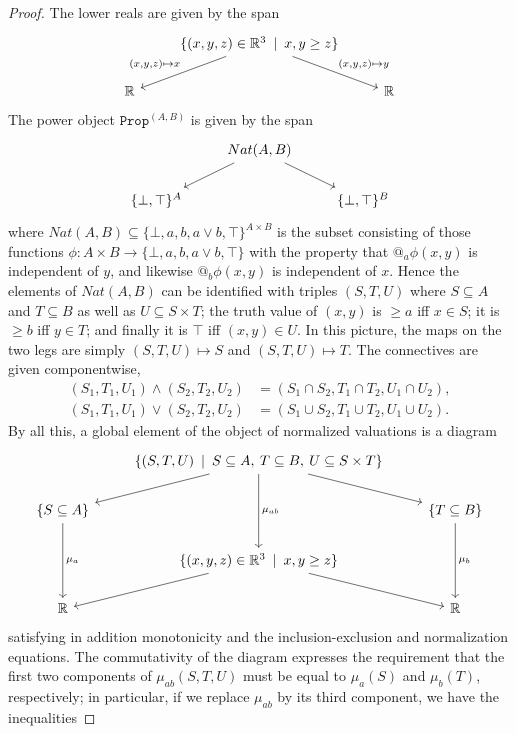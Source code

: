 \documentclass[11pt, oneside, article]{memoir}
\makeatletter
\theoremstyle{plain}
\theoremstyle{definition}
\theoremstyle{remark}
\newcommand{\const}[1]{\mathtt{#1}}
\newcommand{\Prop}{\const{Prop}}
\newcommand{\AtSymbol}{{@}}
\newcommand{\At}[2][]{\AtSymbol^{#1}_{#2}}
\makeatother
\begin{document}
\begin{proof}
The lower reals are given by the span
\[\begin{tikzcd}
	& \{ (x, y, z) \in\mathbb{R}^3 \:\mid\: x,y\geq z \} \ar[swap]{dl}{(x,y,z)\mapsto x} \ar{dr}{(x,y,z)\mapsto y} \\
	\mathbb{R} & & \mathbb{R}
\end{tikzcd}\]
The power object $\Prop^{(A,B)}$ is given by the span
\[\begin{tikzcd}
	& Nat(A,B) \ar{dl} \ar{dr} \\
	\{\bot,\top\}^A & & \{\bot,\top\}^B
\end{tikzcd}\]
where $Nat(A,B)\subseteq \{\bot,a,b,a\lor b,\top\}^{A\times B}$ is the subset consisting of those functions $\phi : A\times B \to \{\bot,a,b,a\lor b,\top\}$ with the property that $\At{a} \phi(x,y)$ is independent of $y$, and likewise $\At{b} \phi(x,y)$ is independent of $x$. Hence the elements of $Nat(A,B)$ can be identified with triples $(S,T,U)$ where $S\subseteq A$ and $T\subseteq B$ as well as $U\subseteq S\times T$; the truth value of $(x,y)$ is $\geq a$ iff $x\in S$; it is $\geq b$ iff $y\in T$; and finally it is $\top$ iff $(x,y)\in U$. In this picture, the maps on the two legs are simply $(S,T,U)\mapsto S$ and $(S,T,U)\mapsto T$. The connectives are given componentwise,
\begin{align*}
	(S_1,T_1,U_1) \land (S_2,T_2,U_2) & = (S_1\cap S_2,T_1\cap T_2,U_1\cap U_2),\\
	(S_1,T_1,U_1) \lor (S_2,T_2,U_2)  & = (S_1\cup S_2,T_1\cup T_2,U_1\cup U_2).
\end{align*}
By all this, a global element of the object of normalized valuations is a diagram
\[\begin{tikzcd}
	& \{(S,T,U) \:\mid\: S \subseteq A , \: T \subseteq B , \: U \subseteq S\times T \} \ar{dl} \ar{dr} \ar{dd}{\mu_{ab}} \\
	\{ S \subseteq A \} \ar{dd}{\mu_a} & & \{ T \subseteq B \} \ar{dd}{\mu_b} \\
	& \{ (x,y,z) \in \mathbb{R}^3 \:\mid\: x,y\geq z \} \ar{dl} \ar{dr} \\
	\mathbb{R} & & \mathbb{R}
\end{tikzcd}\]
satisfying in addition monotonicity and the inclusion-exclusion and normalization equations. The commutativity of the diagram expresses the requirement that the first two components of $\mu_{ab}(S,T,U)$ must be equal to $\mu_a(S)$ and $\mu_b(T)$, respectively; in particular, if we replace $\mu_{ab}$ by its third component, we have the inequalities

\end{proof}
\end{document}
